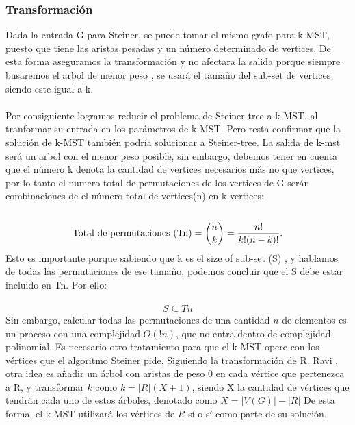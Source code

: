 \documentclass[spanish,12pt]{elsarticle}
\begin{document}
\subsubsection{Transformación}
\textnormal{Dada la entrada G para Steiner, se puede tomar el mismo grafo para k-MST, puesto que tiene las aristas pesadas y un número determinado de vertices. De esta forma aseguramos la transformación y no afectara la salida porque siempre busaremos el arbol de menor peso , se usará el tamaño del sub-set de vertices siendo este igual a k.}\\\\
\textnormal{Por consiguiente logramos reducir el problema de Steiner tree a k-MST, al tranformar su entrada en los parámetros de k-MST. Pero resta confirmar que la solución de k-MST también podría solucionar a Steiner-tree. La salida de k-mst será un arbol con el menor peso posible, sin embargo, debemos tener en cuenta que el número k denota la cantidad de vertices necesarios más no que vertices, por lo tanto el numero total de permutaciones de los vertices de G serán combinaciones de el número total de vertices(n) en k vertices:}\\\\
\textit{
\[
\textnormal{Total~de~permutaciones (Tn)}= \binom{n}{k} = \frac{n!}{k!(n - k)! }.
\]
}
\textnormal{Esto es importante porque sabiendo que k es el size of sub-set (S) , y hablamos de todas las permutaciones de ese tamaño, podemos concluir que el S debe estar incluido en Tn. Por ello:  }\\\\
\textit{
\[
S \subseteq Tn
\]
}
\clearpage
Sin embargo, calcular todas las permutaciones de una cantidad $n$ de elementos es un proceso con una complejidad $O(!n)$, que no entra dentro de complejidad polinomial. Es necesario otro tratamiento para que el k-MST opere con los vértices que el algoritmo Steiner pide. Siguiendo la transformación de R. Ravi \cite{3}, otra idea es añadir un árbol con aristas de peso 0 en cada vértice que pertenezca a R, y transformar $k$ como $k = |R|(X+1)$, siendo X la cantidad de vértices que tendrán cada uno de estos árboles, denotado como $X = |V(G)|-|R|$ De esta forma, el k-MST utilizará los vértices de $R$ sí o sí como parte de su solución.
\\\\ 
\end{document}
